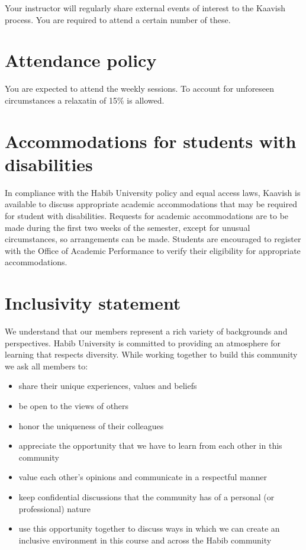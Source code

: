 \documentclass[a4paper]{article}
\newcommand{\new}[1]{{#1}}
\begin{document}
\new{Your instructor will regularly share external events of interest to the Kaavish process. You are required to attend a certain number of these.}

\section{Attendance policy}

\new{You are expected to attend the weekly sessions. To account for unforeseen circumstances a relaxatin of 15\% is allowed.}

\section{Accommodations for students with disabilities}
In compliance with the Habib University policy and equal access laws, Kaavish is available to discuss appropriate academic accommodations that may be required for student with disabilities. Requests for academic accommodations are to be made during the first two weeks of the semester, except for unusual circumstances, so arrangements can be made. Students are encouraged to register with the Office of Academic Performance to verify their eligibility for appropriate accommodations.

\section{Inclusivity statement}
We understand that our members represent a rich variety of backgrounds and perspectives. Habib University is committed to providing an atmosphere for learning that respects diversity. While working together to build this community we ask all members to:
\begin{itemize}
	\item share their unique experiences, values and beliefs
	\item be open to the views of others 
	\item honor the uniqueness of their colleagues
	\item appreciate the opportunity that we have to learn from each other in this community
	\item value each other’s opinions and communicate in a respectful manner
	\item keep confidential discussions that the community has of a personal (or professional) nature 
	\item use this opportunity together to discuss ways in which we can create an inclusive environment in this course and across the Habib community 
\end{itemize}
\end{document}
